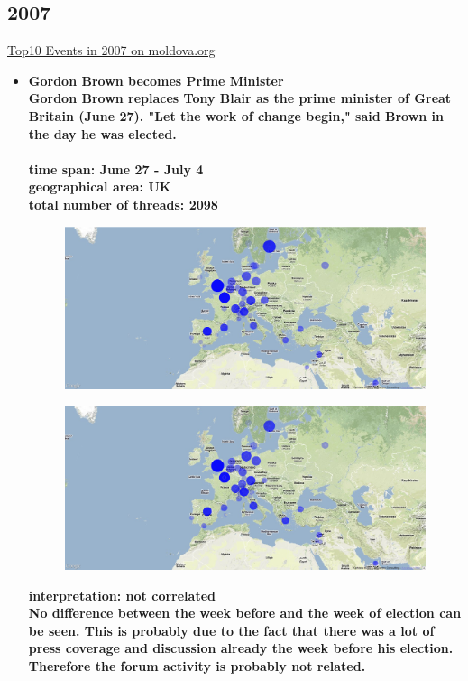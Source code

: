 \documentclass[11pt,a4paper,english]{article}
\begin{document}
			\subsection{2007}
			\href{http://social.moldova.org/news/10-most-important-world-events-of-2007-217388-eng.html}{Top10 Events in 2007 on moldova.org}
				\begin{itemize}
					\item \bf Gordon Brown becomes Prime Minister \rm
						\\ Gordon Brown replaces Tony Blair as the prime minister of Great Britain (June 27). "Let the work of change begin," said Brown in the day he was elected.
						\\\\ \bf time span: \rm June 27 - July 4
						\\ \bf geographical area: \rm UK
						\\ \bf total number of threads: \rm 2098
						\begin{figure}[H]
							\vspace{-13pt}
  							\begin{center}
								\includegraphics[width=130mm]{img/pre-gordon}
							\end{center}
							\vspace{-13pt}
						\end{figure}
						\begin{figure}[H]
							\vspace{-13pt}
	  						\begin{center}
									\includegraphics[width=130mm]{img/post-gordon}
							\end{center}
							\vspace{-13pt}
						\end{figure}	
						\bf interpretation: \rm not correlated
						\\ No difference between the week before and the week of election can be seen. This is probably due to the fact that there was a lot of press coverage and discussion already the week before his election. Therefore the forum activity is probably not related.
						

\end{itemize}
\end{document}
